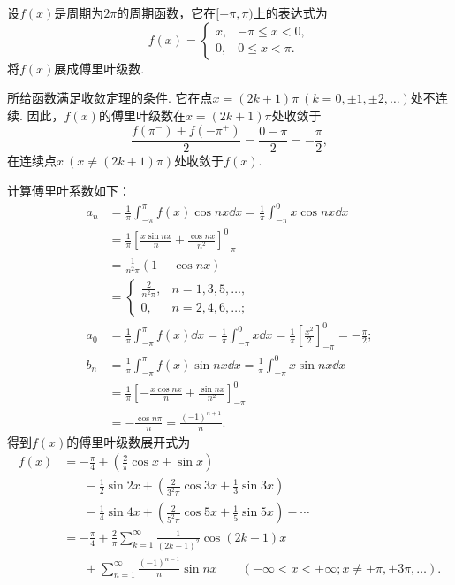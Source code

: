 \begin{example}
设\(f(x)\)是周期为\(2\pi\)的周期函数，它在\([-\pi,\pi)\)上的表达式为\[
f(x) = \left\{ \begin{array}{cc}
x, & -\pi \leq x < 0, \\
0, & 0 \leq x < \pi.
\end{array} \right.
\]
将\(f(x)\)展成傅里叶级数.
\begin{solution}
所给函数满足\hyperref[theorem:无穷级数.傅里叶级数收敛的狄利克雷充分条件]{收敛定理}的条件.
它在点\(x=(2k+1)\pi\ (k=0,\pm1,\pm2,\dotsc)\)处不连续.
因此，\(f(x)\)的傅里叶级数在\(x=(2k+1)\pi\)处收敛于\[
\frac{f(\pi^-)+f(-\pi^+)}{2} = \frac{0-\pi}{2} = -\frac{\pi}{2},
\]在连续点\(x\ (x\neq(2k+1)\pi)\)处收敛于\(f(x)\).

计算傅里叶系数如下：\begin{align*}
	a_n &= \frac{1}{\pi} \int_{-\pi}^\pi f(x) \cos nx \dd{x}
	= \frac{1}{\pi} \int_{-\pi}^0 x \cos nx \dd{x} \\
	&= \frac{1}{\pi} \left[ \frac{x \sin nx}{n} + \frac{\cos nx}{n^2} \right]_{-\pi}^0 \\
	&= \frac{1}{n^2 \pi} (1-\cos nx) \\
	&= \left\{ \begin{array}{cc}
	\frac{2}{n^2 \pi}, & n=1,3,5,\dotsc, \\
	0, & n=2,4,6,\dotsc;
	\end{array} \right. \\
	a_0 &= \frac{1}{\pi} \int_{-\pi}^\pi f(x) \dd{x}
	= \frac{1}{\pi} \int_{-\pi}^0 x \dd{x}
	= \frac{1}{\pi} \left[ \frac{x^2}{2} \right]_{-\pi}^0 = -\frac{\pi}{2}; \\
	b_n &= \frac{1}{\pi} \int_{-\pi}^\pi f(x) \sin nx \dd{x}
	= \frac{1}{\pi} \int_{-\pi}^0 x \sin nx \dd{x} \\
	&= \frac{1}{\pi} \left[ -\frac{x \cos nx}{n} + \frac{\sin nx}{n^2} \right]_{-\pi}^0 \\
	&= -\frac{\cos n\pi}{n} = \frac{(-1)^{n+1}}{n}.
\end{align*}
得到\(f(x)\)的傅里叶级数展开式为\begin{align*}
	f(x) &= -\frac{\pi}{4} + \left(\frac{2}{\pi} \cos x + \sin x\right) \\
	&\hspace{20pt}-\frac{1}{2}\sin 2x + \left(\frac{2}{3^2\pi}\cos 3x + \frac{1}{3}\sin 3x\right) \\
	&\hspace{20pt}-\frac{1}{4}\sin 4x + \left(\frac{2}{5^2\pi}\cos 5x + \frac{1}{5}\sin 5x\right)
	-\dotsb \\
	&= -\frac{\pi}{4} + \frac{2}{\pi} \sum\limits_{k=1}^\infty \frac{1}{(2k-1)^2} \cos(2k-1)x \\
	&\hspace{20pt}+\sum\limits_{n=1}^\infty \frac{(-1)^{n-1}}{n} \sin nx
		\qquad(-\infty<x<+\infty; x\neq\pm\pi,\pm3\pi,\dotsc).
\end{align*}
\end{solution}
\end{example}

